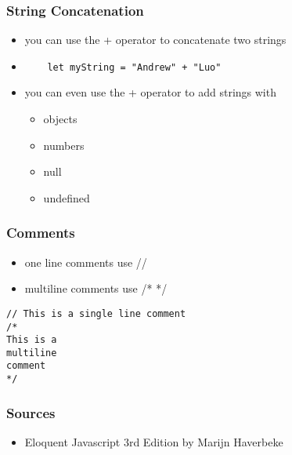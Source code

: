 \documentclass{beamer}
\begin{document}
\begin{frame}[fragile]
\frametitle{String Concatenation}
\begin{itemize}
	\item you can use the + operator to concatenate two strings
	\item \begin{lstlisting} 
	let myString = "Andrew" + "Luo" 
		\end{lstlisting}
	\item you can even use the + operator to add strings with 
		\begin{itemize}
			\item objects
			\item numbers
			\item null
			\item undefined
		\end{itemize}
\end{itemize}
\end{frame}

\begin{frame}[fragile]
\frametitle{Comments}
\begin{itemize}
	\item one line comments use //
	\item multiline comments use /* */
\end{itemize}
\begin{lstlisting}
// This is a single line comment
/*
This is a 
multiline
comment
*/
\end{lstlisting}
\end{frame}

\begin{frame}
\frametitle{Sources}
\begin{itemize}
	\item{Eloquent Javascript 3rd Edition by Marijn Haverbeke}
\end{itemize}
\end{frame}
\end{document}
